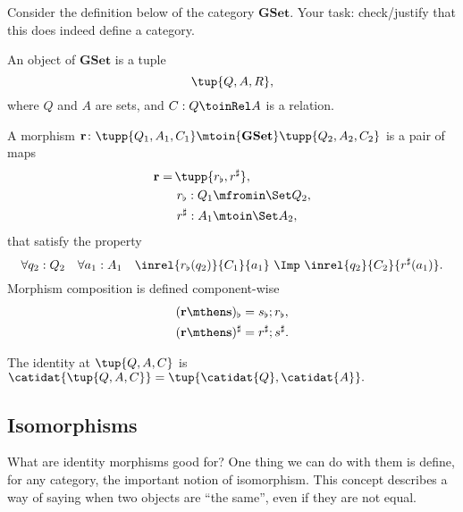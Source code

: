 \begin{gradedexercise}
\label{ex:HwkGSet}

Consider the definition below of the category $\mathbf{GSet}$. Your task: check/justify that this does indeed define a category.
    
\begin{ctdefinition}[GC]
An object of $\mathbf{GSet}$ is a tuple
\begin{equation}
    \tup{Q, A, R},
\end{equation}
where $Q$ and $A$ are sets, and $C : Q \toinRel A$ is a relation.

A morphism
$
    \mathbf{r} \colon \tupp{Q_1, A_1, C_1}
    \mtoin{\mathbf{GSet}}
    \tupp{Q_2, A_2, C_2}
$
is a pair of maps
\begin{align}
     \mathbf{r} = & \,\tupp{r_\flat, r^\sharp}, \\
            & \ r_\flat: Q_1 \mfromin\Set Q_2, \\
            & \ r^\sharp: A_1 \mtoin\Set A_2,
\end{align}
that satisfy the property
\begin{equation}\label{eq:010-gset-mor-cond}
    \forall q_2: Q_2 \quad \forall a_1: A_1 \quad
    \inrel{r_\flat(q_2)}{C_1}{a_1}
    \ \Imp\
    \inrel{q_2}{C_2}{r^\sharp(a_1)}.
\end{equation}
Morphism composition is defined component-wise
\begin{align}
    ( \mathbf{r} \mthen \mathbf{s} )_\flat &= s_\flat ; r_\flat, \\
    ( \mathbf{r} \mthen \mathbf{s} )^\sharp &= r^\sharp ; s^\sharp.
\end{align}

The identity at $\tup{Q, A, C}$ is
$
    \catidat{\tup{Q, A, C}} =
    \tup{
        \catidat{Q}, \catidat{A}
    }.
$
\end{ctdefinition}
\end{gradedexercise}


\subsection{Isomorphisms}

What are identity morphisms good for? One thing we can do with them is define, for any category, the important notion of isomorphism.
This concept describes a way of saying when two objects are ``the same'', even if they are not equal.

